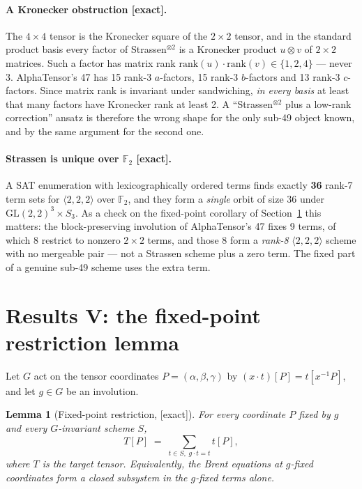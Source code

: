\documentclass[11pt]{article}
\newtheorem{lemma}{Lemma}
\newcommand{\FF}{\mathbb{F}_2}
\newcommand{\tw}[3]{\langle #1,#2,#3\rangle}
\newcommand{\GL}{\mathrm{GL}}
\begin{document}
\paragraph{A Kronecker obstruction [exact].} The $4\times4$ tensor is the Kronecker square of the
$2\times2$ tensor, and in the standard product basis every factor of Strassen$^{\otimes2}$ is a Kronecker
product $u\otimes v$ of $2\times2$ matrices. Such a factor has matrix rank
$\mathrm{rank}(u)\cdot\mathrm{rank}(v)\in\{1,2,4\}$ --- never 3. AlphaTensor's 47 has 15 rank-3
$a$-factors, 15 rank-3 $b$-factors and 13 rank-3 $c$-factors. Since matrix rank is invariant under
sandwiching, \emph{in every basis} at least that many factors have Kronecker rank at least 2. A
``Strassen$^{\otimes2}$ plus a low-rank correction'' ansatz is therefore the wrong shape for the only
sub-49 object known, and by the same argument for the second one.

\paragraph{Strassen is unique over $\FF$ [exact].} A SAT enumeration with lexicographically ordered terms
finds exactly \textbf{36} rank-7 term sets for $\tw222$ over $\FF$, and they form a \emph{single} orbit
of size 36 under $\GL(2,2)^3\times S_3$. As a check on the fixed-point corollary of
Section~\ref{sec:lemma} this matters: the block-preserving involution of AlphaTensor's 47 fixes 9 terms,
of which 8 restrict to nonzero $2\times2$ terms, and those 8 form a \emph{rank-8} $\tw222$ scheme with no
mergeable pair --- not a Strassen scheme plus a zero term. The fixed part of a genuine sub-49 scheme uses
the extra term.

\section{Results V: the fixed-point restriction lemma}
\label{sec:lemma}

Let $G$ act on the tensor coordinates $P=(\alpha,\beta,\gamma)$ by $(x\cdot t)[P] = t[x^{-1}P]$, and let
$g\in G$ be an involution.

\begin{lemma}[Fixed-point restriction, {[exact]}]
For every coordinate $P$ fixed by $g$ and every $G$-invariant scheme $S$,
\[
T[P] \;=\; \sum_{t \in S,\; g\cdot t = t} t[P] ,
\]
where $T$ is the target tensor. Equivalently, the Brent equations at $g$-fixed coordinates form a closed
subsystem in the $g$-fixed terms alone.
\end{lemma}
\end{document}
